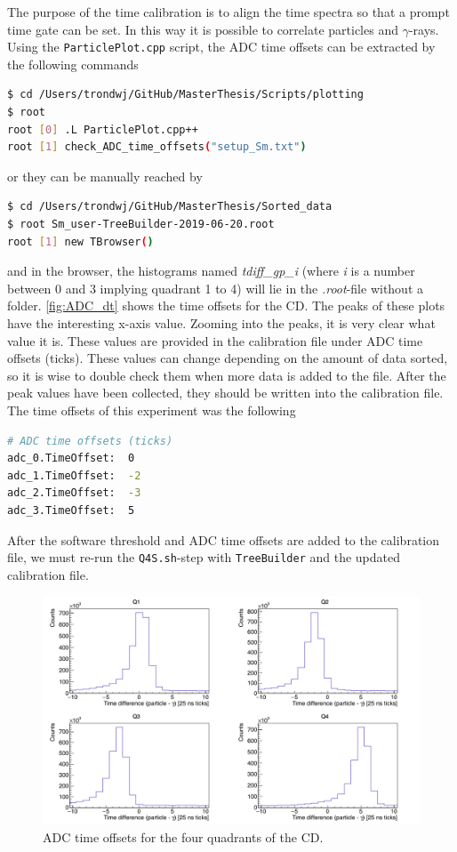 \documentclass[twoside,english]{uiofysmaster/uiofysmaster}
\newcommand{\ga}{$\gamma$}
\begin{document}
The purpose of the time calibration is to align the time spectra so that a prompt time gate can be set. In this way it is possible to correlate particles and \ga-rays. Using the \texttt{ParticlePlot.cpp} script, the ADC time offsets can be extracted by the following commands
\begin{lstlisting}[language=sh]
$ cd /Users/trondwj/GitHub/MasterThesis/Scripts/plotting
$ root
root [0] .L ParticlePlot.cpp++
root [1] check_ADC_time_offsets("setup_Sm.txt")
\end{lstlisting}
or they can be manually reached by
\begin{lstlisting}[language=sh]
$ cd /Users/trondwj/GitHub/MasterThesis/Sorted_data
$ root Sm_user-TreeBuilder-2019-06-20.root
root [1] new TBrowser()
\end{lstlisting}
and in the browser, the histograms named \textit{tdiff\_gp\_i} (where \textit{i} is a number between 0 and 3 implying quadrant 1 to 4) will lie in the \textit{.root}-file without a folder. \autoref{fig:ADC_dt} shows the time offsets for the CD. The peaks of these plots have the interesting x-axis value. Zooming into the peaks, it is very clear what value it is. These values are provided in the calibration file under ADC time offsets (ticks). These values can change depending on the amount of data sorted, so it is wise to double check them when more data is added to the file. After the peak values have been collected, they should be written into the calibration file. The time offsets of this experiment was the following
\begin{lstlisting}[language=sh]
# ADC time offsets (ticks)
adc_0.TimeOffset:  0
adc_1.TimeOffset:  -2
adc_2.TimeOffset:  -3
adc_3.TimeOffset:  5
\end{lstlisting}
After the software threshold and ADC time offsets are added to the calibration file, we must re-run the \texttt{Q4S.sh}-step with \texttt{TreeBuilder} and the updated calibration file.

\begin{figure}[ht]
	\centering
	\includegraphics[width=\textwidth]{../Plots/plotting/tdiff_gp_0-3-user.png}
	\caption{ADC time offsets for the four quadrants of the CD.}
	\label{fig:ADC_dt}
\end{figure}
\end{document}
